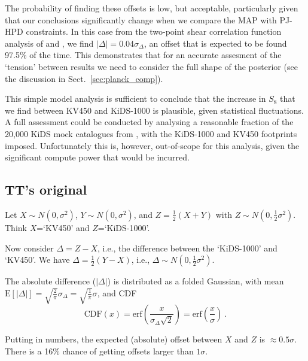 \begin{appendix}
The probability of finding these offsets is low, but acceptable, particularly given that our conclusions significantly change when we compare the MAP with PJ-HPD constraints.  In this case from the two-point shear correlation function analysis of \citet[][KV450 X: $S_8 = 0.767^{+0.043}_{-0.038}$]{wright/etal:2020b} and \citet[][KiDS-1000 Z: $S_8=0.768^{+0.022}_{-0.015}$]{asgari/etal:inprep}, we find $|\Delta|=0.04\sigma_\Delta$, an offset that is expected to be found 97.5\% of the time.   This demonstrates that for an accurate assesment of the `tension' between results we need to consider the full shape of the posterior (see the discussion in Sect.~\ref{sec:planck_comp}).

This simple model analysis is sufficient to conclude that the increase in $S_8$ that we find between KV450 and KiDS-1000 is plausible, given statistical fluctuations.    A full assessment could be conducted by analysing a reasonable fraction of the 20,000 KiDS mock catalogues from \citet{joachimi/etal:inprep}, with the KiDS-1000 and KV450 footprints imposed.  Unfortunately this is, however, out-of-scope for this analysis, given the significant compute power that would be incurred.



\subsection{TT's original}

Let $X\sim N(0,\sigma^2)$, $Y\sim N(0,\sigma^2)$, and $Z=\frac{1}{2}(X+Y)$ with $Z\sim N(0, \frac{1}{2}\sigma^2)$. Think $X$=`KV450' and $Z$=`KiDS-1000'.

Now consider $\Delta=Z-X$, i.e., the difference between the `KiDS-1000' and `KV450'. We have $\Delta=\frac{1}{2}(Y-X)$, i.e., $\Delta\sim N(0, \frac{1}{2}\sigma^2)$.

The absolute difference ($|\Delta|$) is distributed as a folded Gaussian, with mean $\mathrm{E}[|\Delta|] = \sqrt{\frac{2}{\pi}}\sigma_\Delta = \sqrt{\frac{1}{\pi}}\sigma$, and CDF
\begin{equation}
   \mathrm{CDF}(x) = \mathrm{erf}\left(\frac{x}{\sigma_\Delta\sqrt{2}}\right) = \mathrm{erf}\left(\frac{x}{\sigma}\right) \ .
\end{equation}

Putting in numbers, the expected (absolute) offset between $X$ and $Z$ is $\approx 0.5\sigma$. There is a 16\% chance of getting offsets larger than $1\sigma$.


\end{appendix}
